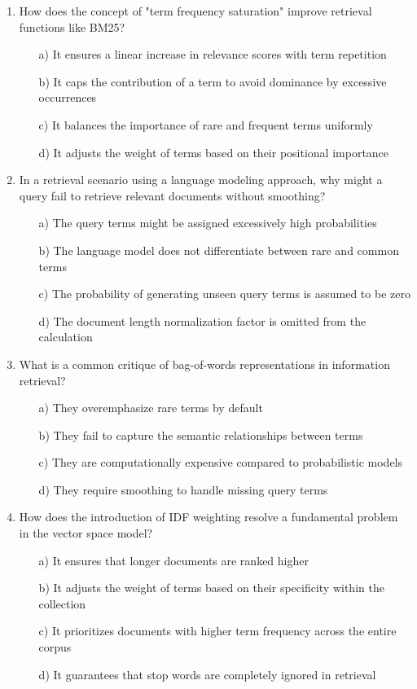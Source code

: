 \documentclass[8pt]{extarticle}
\begin{document}
\begin{multicols}{2}
\begin{enumerate}
\item How does the concept of "term frequency saturation" improve retrieval functions like BM25?
\begin{itemize}
    \item[a)] It ensures a linear increase in relevance scores with term repetition
    \item[b)] It caps the contribution of a term to avoid dominance by excessive occurrences
    \item[c)] It balances the importance of rare and frequent terms uniformly
    \item[d)] It adjusts the weight of terms based on their positional importance
\end{itemize}
 

\item In a retrieval scenario using a language modeling approach, why might a query fail to retrieve relevant documents without smoothing?
\begin{itemize}
    \item[a)] The query terms might be assigned excessively high probabilities
    \item[b)] The language model does not differentiate between rare and common terms
    \item[c)] The probability of generating unseen query terms is assumed to be zero
    \item[d)] The document length normalization factor is omitted from the calculation
\end{itemize}
 

\item What is a common critique of bag-of-words representations in information retrieval?
\begin{itemize}
    \item[a)] They overemphasize rare terms by default
    \item[b)] They fail to capture the semantic relationships between terms
    \item[c)] They are computationally expensive compared to probabilistic models
    \item[d)] They require smoothing to handle missing query terms
\end{itemize}
 

\item How does the introduction of IDF weighting resolve a fundamental problem in the vector space model?
\begin{itemize}
    \item[a)] It ensures that longer documents are ranked higher
    \item[b)] It adjusts the weight of terms based on their specificity within the collection
    \item[c)] It prioritizes documents with higher term frequency across the entire corpus
    \item[d)] It guarantees that stop words are completely ignored in retrieval
\end{itemize}
 


\end{enumerate}
\end{multicols}
\end{document}
